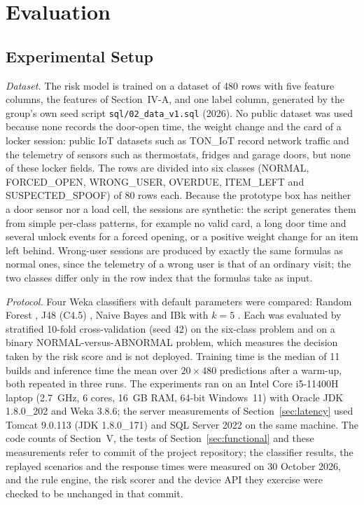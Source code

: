 \section{Evaluation}
\label{sec:ml}

\subsection{Experimental Setup}

\textit{Dataset.} The risk model is trained on a dataset of 480 rows with five feature columns, the features of
Section~IV-A, and one label column, generated by the group's own seed script \texttt{sql/02\_data\_v1.sql} (2026). No
public dataset was used because none records the door-open time, the weight change and the card of a locker session:
public IoT datasets such as TON\_IoT \cite{moustafa2021toniot} record network traffic and the telemetry of sensors
such as thermostats, fridges and garage doors, but none of these locker fields. The rows are divided into six classes
(NORMAL, FORCED\_OPEN, WRONG\_USER, OVERDUE, ITEM\_LEFT and SUSPECTED\_SPOOF) of 80 rows each. Because the prototype
box has neither a door sensor nor a load cell, the sessions are synthetic: the script generates them from simple
per-class patterns, for example no valid card, a long door time and several unlock events for a forced opening, or a
positive weight change for an item left behind. Wrong-user sessions are produced by exactly the same formulas as
normal ones, since the telemetry of a wrong user is that of an ordinary visit; the two classes differ only in the row
index that the formulas take as input.

\textit{Protocol.} Four Weka classifiers with default parameters were compared: Random Forest \cite{breiman2001rf},
J48 (C4.5) \cite{quinlan1993c45}, Naive Bayes \cite{john1995nb} and IBk with $k = 5$ \cite{aha1991ibl}. Each was
evaluated by stratified 10-fold cross-validation \cite{kohavi1995cv} (seed 42) on the six-class problem and on a binary
NORMAL-versus-ABNORMAL problem, which measures the decision taken by the risk score and is not deployed. Training time
is the median of 11 builds and inference time the mean over $20 \times 480$ predictions after a warm-up, both repeated
in three runs. The experiments ran on an Intel Core i5-11400H laptop (2.7~GHz, 6 cores, 16~GB RAM, 64-bit Windows~11)
with Oracle JDK 1.8.0\_202 and Weka 3.8.6; the server measurements of Section~\ref{sec:latency} used Tomcat 9.0.113 (JDK
1.8.0\_171) and SQL Server 2022 on the same machine. The code counts of Section~V, the tests of Section~\ref{sec:functional} and these measurements refer to commit
\texttt{\measurecommit} of the project repository; the classifier results, the replayed scenarios and the response times
were measured on 30 October 2026, and the rule engine, the risk scorer and the device API they exercise were checked to
be unchanged in that commit.


